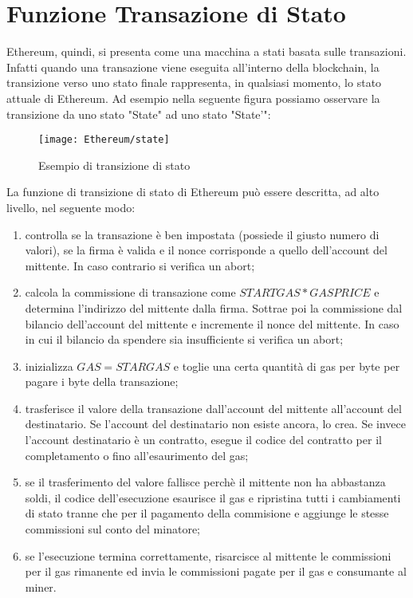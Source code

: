 \section{Funzione Transazione di Stato}
%
Ethereum, quindi, si presenta come una macchina a stati basata sulle transazioni. Infatti quando una transazione viene eseguita all'interno della blockchain, la transizione verso uno stato finale rappresenta, in qualsiasi momento, lo stato attuale di Ethereum. Ad esempio nella seguente figura possiamo osservare la transizione da uno stato "State" ad uno stato "State'":
\begin{center}
	\begin{figure}[h!]
		\centering
		\texttt{[image: Ethereum/state]}
		\caption{Esempio di transizione di stato}
		\label{fig:esempio di transazione di stato}
	\end{figure}
\end{center}
La funzione di transizione di stato di Ethereum può essere descritta, ad alto livello, nel seguente modo:
\begin{enumerate}
	\item controlla se la transazione è ben impostata (possiede il giusto numero di valori), se la firma è valida e il nonce corrisponde a quello dell'account del mittente. In caso contrario si verifica un abort;
	\item calcola la commissione di transazione come $STARTGAS*GASPRICE$ e determina l'indirizzo del mittente dalla firma. Sottrae poi la commissione dal bilancio dell'account del mittente e incremente il nonce del mittente. In caso in cui il bilancio da spendere sia insufficiente si verifica un abort;
	\item inizializza $GAS = STARGAS$ e toglie una certa quantità di gas per byte per pagare i byte della transazione;
	\item trasferisce il valore della transazione dall'account del mittente all'account del destinatario. Se l'account del destinatario non esiste ancora, lo crea. Se invece l'account destinatario è un contratto, esegue il codice del contratto per il completamento o fino all'esaurimento del gas;
	\item se il trasferimento del valore fallisce perchè il mittente non ha abbastanza soldi, il codice dell'esecuzione esaurisce il gas e ripristina tutti i cambiamenti di stato tranne che per il pagamento della commisione e aggiunge le stesse commissioni sul conto del minatore;
	\item se l'esecuzione termina correttamente, risarcisce al mittente le commissioni per il gas rimanente ed invia le commissioni pagate per il gas e consumante al miner.
\end{enumerate}%
